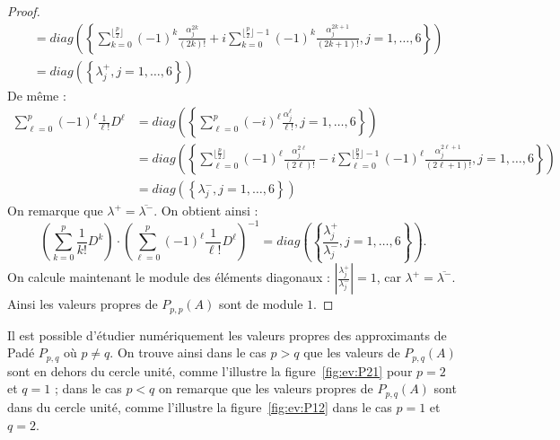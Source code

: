\begin{proof}
$$\begin{aligned}
                                   & = diag\left(\left\{ \sum_{k=0}^{\lfloor\frac{p}{2}\rfloor}(-1)^k\frac{\alpha_j^{2k}}{(2k)!} + i\sum_{k=0}^{\lfloor\frac{p}{2}\rfloor-1}(-1)^k\frac{\alpha_j^{2k+1}}{(2k+1)!} , j=1,\dots,6 \right\}\right) \\
                                   & = diag\left(\left\{ \lambda^+_j , j=1,\dots,6 \right\}\right)
    \end{aligned}
  $$
  De même :
  $$
    \begin{aligned}
      \sum_{\ell=0}^p (-1)^\ell\frac{1}{\ell!}D^\ell & = diag\left(\left\{ \sum_{\ell=0}^p(-i)^\ell\frac{\alpha_j^\ell}{\ell!} , j=1,\dots,6 \right\}\right) \\
                                                     & = diag\left(\left\{ \sum_{\ell=0}^{\lfloor\frac{p}{2}\rfloor}(-1)^\ell\frac{\alpha_j^{2\ell}}{(2\ell)!} - i\sum_{\ell=0}^{\lfloor\frac{p}{2}\rfloor-1}(-1)^\ell\frac{\alpha_j^{2\ell+1}}{(2\ell+1)!} , j=1,\dots,6 \right\}\right) \\
                                                     & = diag\left(\left\{ \lambda^-_j , j=1,\dots,6 \right\}\right)
    \end{aligned}
  $$
  On remarque que $\lambda^+ = \overline{\lambda^-}$. On obtient ainsi :
  $$
    \left( \sum_{k=0}^p \frac{1}{k!}D^k \right) \cdot \left(\sum_{\ell=0}^p (-1)^\ell \frac{1}{\ell!}D^\ell \right)^{-1}
    =
    diag\left(\left\{ \frac{\lambda_j^+}{\lambda_j^-} , j=1,\dots,6\right\}\right).
  $$
  On calcule maintenant le module des éléments diagonaux : $\left|\frac{\lambda_j^+}{\lambda_j^-}\right| = 1$, car $\lambda^+ = \overline{\lambda^-}$. Ainsi les valeurs propres de $P_{p,p}(A)$ sont de module $1$.
\end{proof}

Il est possible d'étudier numériquement les valeurs propres des approximants de Padé $P_{p,q}$ où $p\neq q$. On trouve ainsi dans le cas $p>q$ que les valeurs de $P_{p,q}(A)$ sont en dehors du cercle unité, comme l'illustre la figure~\ref{fig:ev:P21} pour $p=2$ et $q=1$ ; dans le cas $p<q$ on remarque que les valeurs propres de $P_{p,q}(A)$ sont dans du cercle unité, comme l'illustre la figure~\ref{fig:ev:P12} dans le cas $p=1$ et $q=2$.

